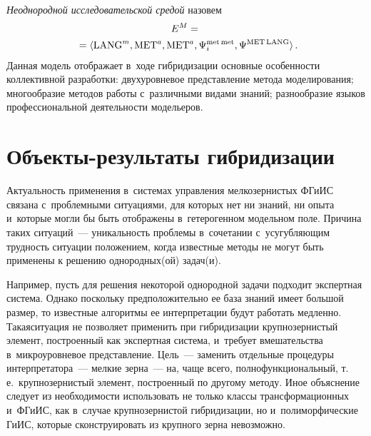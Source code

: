 \begin{multicols}{2}
  \textit{Неоднородной исследовательской средой} назовем
\begin{multline*}
  E^M= {}\\
  {}=\langle \mathrm{LANG}^m, \mathrm{MET}^a, \mathrm{MET}^a, 
\Psi_i^{\mathrm{met\,met}},  \Psi^{\mathrm{MET\,LANG}}\rangle\,.\hspace*{-2pt}
  \end{multline*}
    Данная модель отображает в~ходе гибридизации основные особенности коллективной 
разработки: двухуровневое представление метода моделирования; многообразие методов 
работы с~различными видами знаний; разнообразие языков профессиональной деятельности 
модельеров.

\vspace*{-6pt}
  
\section{Объекты-результаты гибридизации } %
  
  Актуальность применения в~системах управления мелкозернистых ФГиИС связана 
с~проблемными ситуациями, для которых нет ни знаний, ни опыта и~которые могли бы быть 
отображены в~гетерогенном модельном поле. Причина таких ситуаций~--- уникальность 
проблемы в~сочетании с~усугубляющим трудность ситуации положением, когда известные 
методы не могут быть применены к решению однородных(ой) задач(и). 

Например, пусть для 
решения некоторой однородной задачи подходит экспертная система. Однако поскольку 
предположительно ее база знаний имеет большой размер, то известные алгоритмы ее 
интерпретации будут работать медленно. Такая\linebreak ситуация не позволяет применить при 
гибридизации крупнозернистый элемент, построенный как экспертная система, и~требует 
вмешательства в~мик\-ро\-уровневое представление. Цель~--- заменить отдельные процедуры 
интерпретатора~--- мелкие зерна~--- на, чаще всего, полнофункциональный, т.\,е.\ 
крупнозернистый элемент, построенный по другому методу. Иное объяснение следует из 
необходимости использовать не только классы трансформационных и~ФГиИС, 
как в~случае крупнозернистой гибридизации, но и~полиморфические ГиИС, которые 
сконструировать из крупного зерна невозможно. 


\end{multicols}

